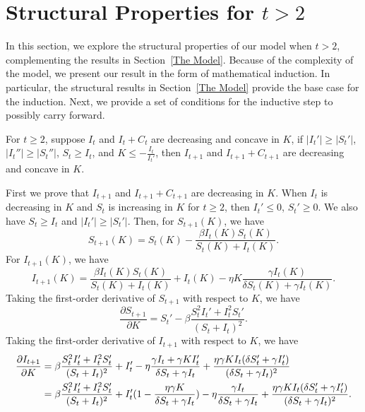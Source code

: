 \documentclass[nonblindrev, copyedit]{informs3a}
\newcounter{prop}[chapter]
\begin{document}
\endproof

\section{Structural Properties for $t>2$}
\label{Appendix Proofs of extensions of four propositions}
In this section, we explore the structural properties of our model when $t>2$, complementing the results in Section~\ref{The Model}.
Because of the complexity of the model, we present our result in the form of mathematical induction.
In particular, the structural results in Section~\ref{The Model} provide the base case for the induction.
Next, we provide a set of conditions for the inductive step to possibly carry forward.

\begin{proposition}
\label{Extensions with K}
For $t\ge2$, suppose $I_{t}$ and $I_{t}+C_{t}$ are decreasing and concave in $K$, if $|I_{t}'|\ge|S_{t}'|$, $|I_{t}''|\ge|S_{t}''|$, $S_{t}\ge I_{t}$, and $K\le-\frac{I_{t}}{I_{t}'}$,
then $I_{t+1}$ and $I_{t+1}+C_{t+1}$ are decreasing and concave in $K$.
\end{proposition}


First we prove that $I_{t+1}$ and $I_{t+1}+C_{t+1}$ are decreasing in $K$.
When $I_t$ is decreasing in $K$ and $S_t$ is increasing in $K$ for $t\ge2$, then $I_t'\le 0$, $S_t'\ge 0$. We also have $S_t\ge I_t$ and $|I_t'|\ge|S_t'|$. Then, for $S_{t+1}(K)$, we have
\begin{equation}\label{eq:st+1}
    S_{t+1}(K)=S_{t}(K)-\frac{\beta I_{t}(K)S_{t}(K)}{S_{t}(K)+I_{t}(K)}.
\end{equation}
For $I_{t+1}(K)$, we have
\begin{equation}\label{eq:it+1}
    I_{t+1}(K)=\frac{\beta I_{t}(K)S_{t}(K)}{S_{t}(K)+I_{t}(K)}+I_{t}(K)-\eta K\frac{\gamma I_{t}(K)}{\delta S_{t}(K)+\gamma I_{t}(K)}.
\end{equation}
Taking the first-order derivative of $S_{t+1}$ with respect to $K$, we have
\begin{equation*}
    \frac{\partial S_{t+1}}{\partial K}=S_{t}'-\beta\frac{S_{t}^2I_t'+I_{t}^2S_t'}{(S_{t}+I_{t})^2}.
\end{equation*}
Taking the first-order derivative of $I_{t+1}$ with respect to $K$, we have
\begin{align}
    \frac{\partial I_{t+1}}{\partial K}&=\beta\frac{S_{t}^2I_t'+I_{t}^2S_t'}{(S_{t}+I_{t})^2}+I_t'-\eta\frac{\gamma I_t+\gamma KI_t'}{\delta S_{t}+\gamma I_{t}}+\frac{\eta\gamma KI_t(\delta S_{t}'+\gamma I_{t}')}{(\delta S_{t}+\gamma I_{t})^2}\notag\\
    &=\beta\frac{S_{t}^2I_t'+I_{t}^2S_t'}{(S_{t}+I_{t})^2}+I_t'(1-\frac{\eta\gamma K}{\delta S_{t}+\gamma I_{t}})-\eta\frac{\gamma I_t}{\delta S_{t}+\gamma I_{t}}+\frac{\eta\gamma KI_t(\delta S_{t}'+\gamma I_{t}')}{(\delta S_{t}+\gamma I_{t})^2}.\label{eq:it with k}
\end{align}
\end{document}
